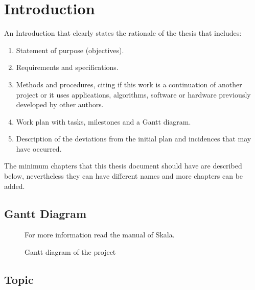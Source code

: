\clearpage
\newpage
\section{Introduction}

{An Introduction that clearly states the rationale of the thesis that includes:}

\begin{enumerate}
\item {Statement of purpose (objectives).}
\item {Requirements and specifications.}
\item {Methods and procedures, citing if this work is a continuation of another project or it uses applications, algorithms,
software or hardware previously developed by other authors.}
\item {Work plan with tasks, milestones and a Gantt diagram.}
\item {Description of the deviations from the initial plan and incidences that may have occurred. }
\end{enumerate}

\bigskip

{The minimum chapters that this thesis document should have are described below, nevertheless they can have different
names and more chapters can be added.}

\bigskip

\subsection{Gantt Diagram}
\label{ssec:gantt}
\begin{figure}[H]
    \centering
    
    \caption[Project's Gantt diagram]{\footnotesize{Gantt diagram of the project}}
    \label{fig:gantt}
    For more information read the manual \cite{skalagantt} of Skala.
\end{figure}

\bigskip

\subsection{Topic}
